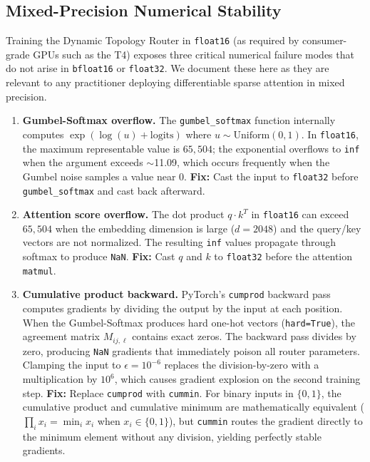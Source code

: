 \documentclass[11pt,a4paper]{article}
\begin{document}
\subsection{Mixed-Precision Numerical Stability}
\label{sec:fp16}

Training the Dynamic Topology Router in \texttt{float16} (as required by consumer-grade GPUs such as the T4) exposes three critical numerical failure modes that do not arise in \texttt{bfloat16} or \texttt{float32}. We document these here as they are relevant to any practitioner deploying differentiable sparse attention in mixed precision.

\begin{enumerate}
    \item \textbf{Gumbel-Softmax overflow.} The \texttt{gumbel\_softmax} function internally computes $\exp(\log(u) + \text{logits})$ where $u \sim \text{Uniform}(0,1)$. In \texttt{float16}, the maximum representable value is $65{,}504$; the exponential overflows to \texttt{inf} when the argument exceeds $\sim$11.09, which occurs frequently when the Gumbel noise samples a value near $0$. \textbf{Fix:} Cast the input to \texttt{float32} before \texttt{gumbel\_softmax} and cast back afterward.

    \item \textbf{Attention score overflow.} The dot product $q \cdot k^T$ in \texttt{float16} can exceed $65{,}504$ when the embedding dimension is large ($d = 2048$) and the query/key vectors are not normalized. The resulting \texttt{inf} values propagate through softmax to produce \texttt{NaN}. \textbf{Fix:} Cast $q$ and $k$ to \texttt{float32} before the attention \texttt{matmul}.

    \item \textbf{Cumulative product backward.} PyTorch's \texttt{cumprod} backward pass computes gradients by dividing the output by the input at each position. When the Gumbel-Softmax produces hard one-hot vectors (\texttt{hard=True}), the agreement matrix $M_{ij,\ell}$ contains exact zeros. The backward pass divides by zero, producing \texttt{NaN} gradients that immediately poison all router parameters. Clamping the input to $\epsilon = 10^{-6}$ replaces the division-by-zero with a multiplication by $10^{6}$, which causes gradient explosion on the second training step. \textbf{Fix:} Replace \texttt{cumprod} with \texttt{cummin}. For binary inputs in $\{0, 1\}$, the cumulative product and cumulative minimum are mathematically equivalent ($\prod_i x_i = \min_i x_i$ when $x_i \in \{0,1\}$), but \texttt{cummin} routes the gradient directly to the minimum element without any division, yielding perfectly stable gradients.
\end{enumerate}
\end{document}
